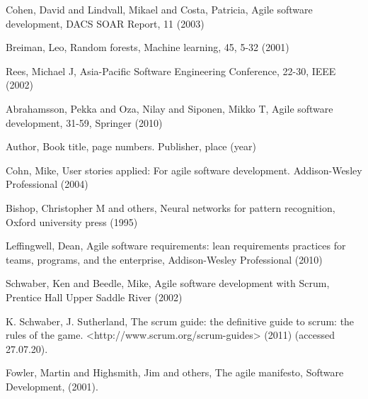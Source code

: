 \begin{thebibliography}{}
Cohen, David and Lindvall, Mikael and Costa, Patricia, Agile software development, DACS SOAR Report, 11 (2003)


Breiman, Leo, Random forests, Machine learning, 45, 5-32 (2001)


Rees, Michael J, Asia-Pacific Software Engineering Conference, 22-30, IEEE (2002)

Abrahamsson, Pekka and Oza, Nilay and Siponen, Mikko T, Agile software development, 31-59, Springer (2010)


Author, Book title, page numbers. Publisher, place (year)









Cohn, Mike, User stories applied: For agile software development. Addison-Wesley Professional (2004)

Bishop, Christopher M and others, Neural networks for pattern recognition, Oxford university press (1995)

Leffingwell, Dean, Agile software requirements: lean requirements practices for teams, programs, and the enterprise, Addison-Wesley Professional (2010)

Schwaber, Ken and Beedle, Mike, Agile software development with Scrum, Prentice Hall Upper Saddle River (2002)

K. Schwaber, J. Sutherland, The scrum guide: the definitive guide to scrum:
the rules of the game. <http://www.scrum.org/scrum-guides> (2011)
(accessed 27.07.20).

Fowler, Martin and Highsmith, Jim and others, 
The agile manifesto, 
Software Development, (2001). 

\end{thebibliography}



